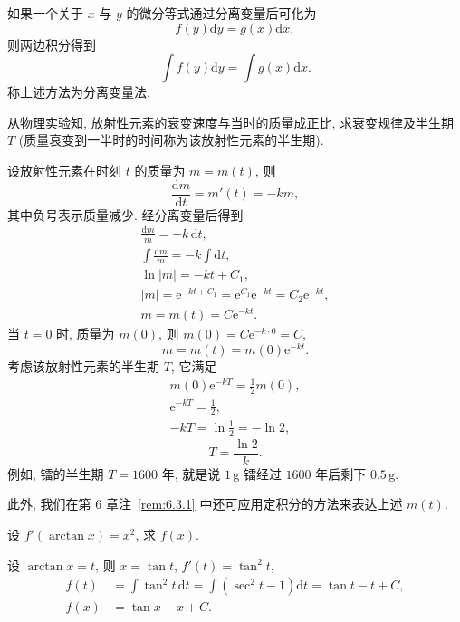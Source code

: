 如果一个关于 $x$ 与 $y$ 的微分等式通过分离变量后可化为
\[
f(y)\mathrm{d}y=g(x)\mathrm{d}x,
\]
则两边积分得到
\[
\int f(y)\mathrm{d}y=\int g(x)\mathrm{d}x.
\]
称上述方法为分离变量法.

\begin{example}\label{ex:5.1.11}
从物理实验知, 放射性元素的衰变速度与当时的质量成正比, 求衰变规律及半生期 $T$ (质量衰变到一半时的时间称为该放射性元素的半生期).
\end{example}

\begin{solution}
设放射性元素在时刻 $t$ 的质量为 $m=m(t)$, 则
\[
\frac{\mathrm{d}m}{\mathrm{d}t}=m'(t)=-km,
\]
其中负号表示质量减少. 经分离变量后得到
\begin{gather*}
\frac{\mathrm{d}m}{m}=-k\,\mathrm{d}t,\\
\int\frac{\mathrm{d}m}{m}=-k\int\mathrm{d}t,\\
\ln|m|=-kt+C_{1},\\
|m|=\mathrm{e}^{-kt+C_{1}}=\mathrm{e}^{C_{1}}\mathrm{e}^{-kt}=C_{2}\mathrm{e}^{-kt},\\
m=m(t)=C\mathrm{e}^{-kt}.
\end{gather*}
当 $t=0$ 时, 质量为 $m(0)$, 则 $m(0)=C\mathrm{e}^{-k\cdot 0}=C$,
\[
m=m(t)=m(0)\mathrm{e}^{-kt}.
\]
考虑该放射性元素的半生期 $T$, 它满足
\begin{gather*}
m(0)\mathrm{e}^{-kT}=\frac{1}{2}m(0),\\
\mathrm{e}^{-kT}=\frac{1}{2},\\
-kT=\ln\frac{1}{2}=-\ln 2,
\end{gather*}
\[
T=\frac{\ln 2}{k}.
\]
例如, 镭的半生期 $T=1600$ 年, 就是说 $1\,\mathrm{g}$ 镭经过 $1600$ 年后剩下 $0.5\,\mathrm{g}$.

此外, 我们在第 6 章注~\ref{rem:6.3.1} 中还可应用定积分的方法来表达上述 $m(t)$.
\end{solution}

\begin{example}\label{ex:5.1.12}
设 $f'(\arctan x)=x^{2}$, 求 $f(x)$.
\end{example}

\begin{solution}
设 $\arctan x=t$, 则 $x=\tan t$, $f'(t)=\tan^{2}t$,
\begin{align*}
f(t)&=\int\tan^{2}t\,\mathrm{d}t=\int(\sec^{2}t-1)\mathrm{d}t=\tan t-t+C,\\
f(x)&=\tan x-x+C.
\end{align*}
\end{solution}

